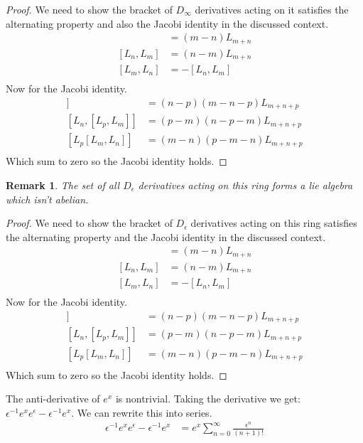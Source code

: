 \documentclass[10pt, oneside]{article}
\newtheorem{rem}{Remark}
\begin{document}
\begin{proof}
    We need to show the bracket of $D_\infty$ derivatives acting on it satisfies the alternating property and also the Jacobi identity in the discussed context.
    \begin{align*}
        [L_m, L_n] &= (m-n)L_{m+n}\\
        [L_n, L_m] &= (n-m)L_{m+n}\\
        [L_m, L_n] &= -[L_n, L_m]\\
    \end{align*}
    Now for the Jacobi identity. 
    \begin{align*}
        [L_m,[L_n, L_p]] &= (n-p)(m-n-p)L_{m+n+p}\\
        [L_n,[L_p, L_m]] &= (p-m)(n-p-m)L_{m+n+p}\\
        [L_p[L_m,L_n]] &= (m-n)(p-m-n)L_{m+n+p}\\
    \end{align*}
    Which sum to zero so the Jacobi identity holds.
\end{proof}
\begin{rem}
    The set of all $D_\epsilon$ derivatives acting on this ring forms a lie algebra which isn't abelian. 
\end{rem}
\begin{proof}
    We need to show the bracket of $D_\epsilon$ derivatives acting on this ring satisfies the alternating property and the Jacobi identity in the discussed context.
    \begin{align*}
        [L_m, L_n] &= (m-n)L_{m+n}\\
        [L_n, L_m] &= (n-m)L_{m+n}\\
        [L_m, L_n] &= -[L_n, L_m]\\
    \end{align*}
    Now for the Jacobi identity. 
    \begin{align*}
        [L_m,[L_n, L_p]] &= (n-p)(m-n-p)L_{m+n+p}\\
        [L_n,[L_p, L_m]] &= (p-m)(n-p-m)L_{m+n+p}\\
        [L_p[L_m,L_n]] &= (m-n)(p-m-n)L_{m+n+p}\\
    \end{align*}
    Which sum to zero so the Jacobi identity holds.
\end{proof}
The anti-derivative of $e^{x}$ is nontrivial. Taking the derivative we get: $\epsilon^{-1} e^{x}e^{\epsilon} - \epsilon^{-1} e^{x}$. We can rewrite this into series.
\begin{align}
    \epsilon^{-1} e^{x}e^{\epsilon} - \epsilon^{-1} e^{x} &= e^{x} \sum_{n=0}^{\infty} \frac{\epsilon^{n}}{(n+1)!}
\end{align}
\end{document}
